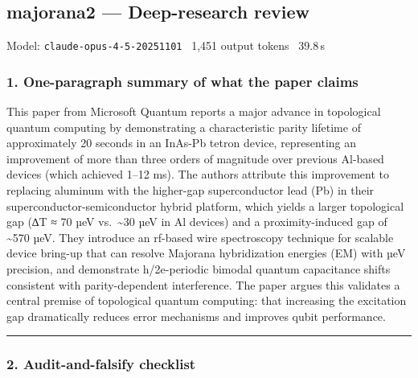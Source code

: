 \documentclass[10pt,letterpaper]{article}
\begin{document}
\subsection{majorana2 --- Deep-research review}
\noindent\textcolor{muted}{\small Model: \texttt{claude-opus-4-5-20251101} \textperiodcentered\ 1,451 output tokens \textperiodcentered\ 39.8\,s}

\hypertarget{one-paragraph-summary-of-what-the-paper-claims}{%
\subsubsection{1. One-paragraph summary of what the paper claims}\label{one-paragraph-summary-of-what-the-paper-claims}}

This paper from Microsoft Quantum reports a major advance in topological quantum computing by demonstrating a characteristic parity lifetime of approximately 20 seconds in an InAs-Pb tetron device, representing an improvement of more than three orders of magnitude over previous Al-based devices (which achieved 1--12 ms). The authors attribute this improvement to replacing aluminum with the higher-gap superconductor lead (Pb) in their superconductor-semiconductor hybrid platform, which yields a larger topological gap (∆T ≈ 70 µeV vs.~\textasciitilde30 µeV in Al devices) and a proximity-induced gap of \textasciitilde570 µeV. They introduce an rf-based wire spectroscopy technique for scalable device bring-up that can resolve Majorana hybridization energies (EM) with µeV precision, and demonstrate h/2e-periodic bimodal quantum capacitance shifts consistent with parity-dependent interference. The paper argues this validates a central premise of topological quantum computing: that increasing the excitation gap dramatically reduces error mechanisms and improves qubit performance.

\begin{center}\rule{0.5\linewidth}{0.5pt}\end{center}

\hypertarget{audit-and-falsify-checklist}{%
\subsubsection{2. Audit-and-falsify checklist}\label{audit-and-falsify-checklist}}
\end{document}
